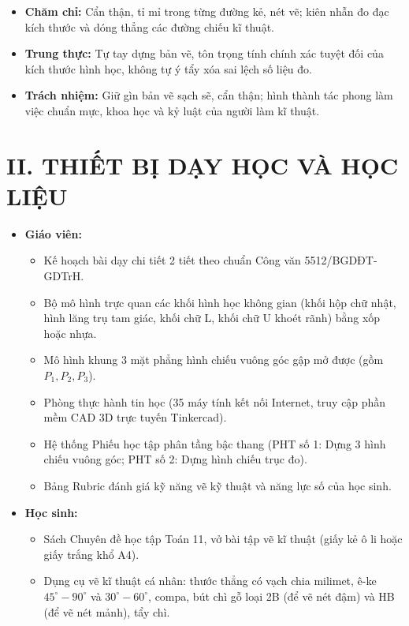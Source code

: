 \documentclass[12pt, a4paper]{article}
\begin{document}
\begin{itemize}[leftmargin=1.2cm]
    \item \textbf{Chăm chỉ:} Cẩn thận, tỉ mỉ trong từng đường kẻ, nét vẽ; kiên nhẫn đo đạc kích thước và dóng thẳng các đường chiếu kĩ thuật.
    \item \textbf{Trung thực:} Tự tay dựng bản vẽ, tôn trọng tính chính xác tuyệt đối của kích thước hình học, không tự ý tẩy xóa sai lệch số liệu đo.
    \item \textbf{Trách nhiệm:} Giữ gìn bản vẽ sạch sẽ, cẩn thận; hình thành tác phong làm việc chuẩn mực, khoa học và kỷ luật của người làm kĩ thuật.
\end{itemize}

\section*{II. THIẾT BỊ DẠY HỌC VÀ HỌC LIỆU}

\begin{itemize}[leftmargin=1.2cm]
    \item \textbf{Giáo viên:}
    \begin{itemize}[leftmargin=0.6cm]
        \item Kế hoạch bài dạy chi tiết 2 tiết theo chuẩn Công văn 5512/BGDĐT-GDTrH.
        \item Bộ mô hình trực quan các khối hình học không gian (khối hộp chữ nhật, hình lăng trụ tam giác, khối chữ L, khối chữ U khoét rãnh) bằng xốp hoặc nhựa.
        \item Mô hình khung 3 mặt phẳng hình chiếu vuông góc gập mở được (gồm $P_1, P_2, P_3$).
        \item Phòng thực hành tin học (35 máy tính kết nối Internet, truy cập phần mềm CAD 3D trực tuyến Tinkercad).
        \item Hệ thống Phiếu học tập phân tầng bậc thang (PHT số 1: Dựng 3 hình chiếu vuông góc; PHT số 2: Dựng hình chiếu trục đo).
        \item Bảng Rubric đánh giá kỹ năng vẽ kỹ thuật và năng lực số của học sinh.
    \end{itemize}

    \item \textbf{Học sinh:}
    \begin{itemize}[leftmargin=0.6cm]
        \item Sách Chuyên đề học tập Toán 11, vở bài tập vẽ kĩ thuật (giấy kẻ ô li hoặc giấy trắng khổ A4).
        \item Dụng cụ vẽ kĩ thuật cá nhân: thước thẳng có vạch chia milimet, ê-ke $45^\circ - 90^\circ$ và $30^\circ - 60^\circ$, compa, bút chì gỗ loại 2B (để vẽ nét đậm) và HB (để vẽ nét mảnh), tẩy chì.
    \end{itemize}
\end{itemize}
\end{document}
